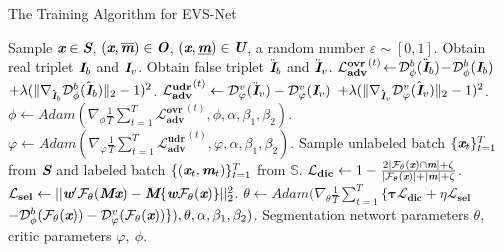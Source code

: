 \documentclass[letterpaper]{article} %
\begin{document}
\begin{algorithm}[!h]
\caption{The Training Algorithm for EVS-Net}
\begin{algorithmic}[1]
\renewcommand{\algorithmicrequire}{\textbf{Require:}}
\renewcommand{\algorithmicensure}{\textbf{Require:}}
\State Sample $\textbf{\em x} \in \textbf{\em S}$, $(\textbf{\em x},\overline{\textbf{\em m}}) \in \textbf{\em O}$, $(\textbf{\em x},\underline{\textbf{\em m}}) \in \textbf{\em U}$,
\Statex\quad \quad \quad \quad \quad a random number $\varepsilon \sim [0,1]$.
\State Obtain real triplet $\textbf{\em I}_b$ and $\textbf{\em I}_v$.
\State Obtain false triplet $\ddot{\textbf{\em I}}_b$ and $\ddot{\textbf{\em I}}_v$.
\State $\mathbf{\mathcal{L}^{ovr}_{adv}}^{(t)}\!\leftarrow\!\mathcal{D}^b_{\phi}(\ddot{\textbf{\em I}}_b)\!-\!\mathcal{D}^b_{\phi}(\textbf{\em I}_b) $
\Statex \quad \qquad \quad \qquad \quad \qquad $+ \lambda(\|\nabla_{\hat{\textbf{\em I}}_b} \mathcal{D}^{b}_{\phi}(\hat{\textbf{\em I}}_b)\|_{2} - 1)^2$.
\State $\mathbf{\mathcal{L}^{udr}_{adv}}^{(t)} \leftarrow \mathcal{D}^v_{\varphi}(\ddot{\textbf{\em I}}_v)- \mathcal{D}^v_{\varphi}(\textbf{\em I}_v)$
\Statex \quad \qquad \quad \qquad \quad \qquad $+ \lambda(\|\nabla_{\hat{\textbf{\em I}}_v} \mathcal{D}^{v}_{\varphi}(\hat{\textbf{\em I}}_v)\|_{2} - 1)^2$.
\EndFor
\State $\phi \leftarrow Adam(\nabla_{\phi}\frac{1}{T} \sum^T_{t=1}\mathbf{\mathcal{L}^{ovr}_{adv}}^{(t)},\phi,\alpha,\beta_1,\beta_2)$.
\State $\varphi \leftarrow Adam(\nabla_{\varphi}\frac{1}{T} \sum^T_{t=1}\mathbf{\mathcal{L}^{udr}_{adv}}^{(t)},\varphi,\alpha,\beta_1,\beta_2)$.
\EndFor
\State Sample unlabeled batch $\{\textbf{\em x}_t\}^T_{t=1}$  from $\textbf{\em S}$  and
\Statex \quad \quad labeled batch $\{(\textbf{\em x}_t, \textbf{\em m}_t)\}^T_{t=1}$ from $\mathbb{S}$.
\State $\mathbf{\mathcal{L}_{dic}}\leftarrow 1-\frac{2|\mathcal{F}_{\theta}(\textbf{\em x}) \cap \textbf{\em m}|+\zeta}{|\mathcal{F}_{\theta}(\textbf{\em x})|+|\textbf{\em m}|+\zeta}$.
\State $\mathbf{\mathcal{L}_{sel}}\leftarrow ||\textbf{\em w}'\mathcal{F}_{\theta}(\textbf{\em M}\textbf{\em x})-\textbf{\em M}\{\textbf{\em w}\mathcal{F}_{\theta}(\textbf{\em x})\}||^2_2$.
\State $\theta \leftarrow Adam(\nabla_{\theta}\frac{1}{T} \sum^T_{t=1}\{\mathbf{\tau\mathcal{L}_{dic}}+ \eta\mathbf{\mathcal{L}_{sel}}$
\Statex \quad \quad \quad $-\mathcal{D}^{b}_{\phi}(\mathcal{F}_{\theta}(\textbf{\em x}))-\mathcal{D}^{v}_{\varphi}(\mathcal{F}_{\theta}(\textbf{\em x}))\}),\theta,\alpha,\beta_1,\beta_2)$.
\EndWhile
\State \Return Segmentation networt parameters $\theta$, critic parameters $\varphi,~\phi$.
\end{algorithmic}
\label{alg:alg1}
\end{algorithm}
\end{document}
